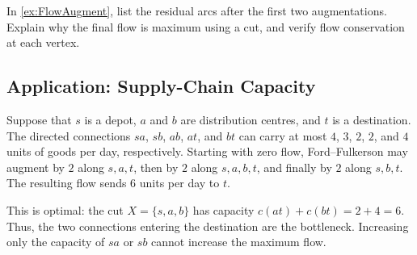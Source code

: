 \begin{Exercise}
In \cref{ex:FlowAugment}, list the residual arcs after the first two augmentations. Explain why the final flow is maximum using a cut, and verify flow conservation at each vertex.
\end{Exercise}

\subsection{Application: Supply-Chain Capacity}\label{subsec:FlowApplication}

\begin{Example}\label{ex:SupplyChainFlow}
Suppose that $s$ is a depot, $a$ and $b$ are distribution centres, and $t$ is a destination. The directed connections $sa$, $sb$, $ab$, $at$, and $bt$ can carry at most $4$, $3$, $2$, $2$, and $4$ units of goods per day, respectively. Starting with zero flow, Ford--Fulkerson may augment by $2$ along $s,a,t$, then by $2$ along $s,a,b,t$, and finally by $2$ along $s,b,t$. The resulting flow sends $6$ units per day to $t$.

This is optimal: the cut $X=\{s,a,b\}$ has capacity $c(at)+c(bt)=2+4=6$. Thus, the two connections entering the destination are the bottleneck. Increasing only the capacity of $sa$ or $sb$ cannot increase the maximum flow.
\end{Example}

%
